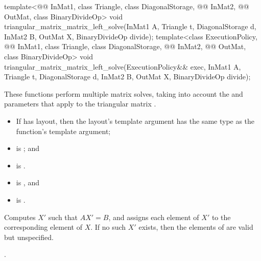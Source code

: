 %
\begin{itemdecl}
template<@@ InMat1, class Triangle, class DiagonalStorage,
         @@ InMat2, @@ OutMat, class BinaryDivideOp>
  void triangular_matrix_matrix_left_solve(InMat1 A, Triangle t, DiagonalStorage d,
                                           InMat2 B, OutMat X, BinaryDivideOp divide);
template<class ExecutionPolicy,
         @@ InMat1, class Triangle, class DiagonalStorage,
         @@ InMat2, @@ OutMat, class BinaryDivideOp>
  void triangular_matrix_matrix_left_solve(ExecutionPolicy&& exec,
                                           InMat1 A, Triangle t, DiagonalStorage d,
                                           InMat2 B, OutMat X, BinaryDivideOp divide);
\end{itemdecl}

\begin{itemdescr}
\pnum
These functions perform multiple matrix solves,
taking into account the  and  parameters
that apply to the triangular matrix .

\pnum
\mandates
\begin{itemize}
\item
If  has  layout, then the
      layout's  template argument has the same type as
      the function's  template argument;
\item
{}
is ; and
\item
{}
is .
\end{itemize}

\pnum
\expects
\begin{itemize}
\item
{} is , and
\item
{} is .
\end{itemize}

\pnum
\effects
Computes $X'$ such that $AX' = B$,
and assigns each element of $X'$ to the corresponding element of $X$.
If no such $X'$ exists,
then the elements of  are valid but unspecified.

\pnum
\complexity
{}.
\end{itemdescr}

